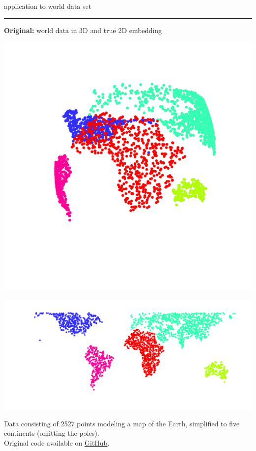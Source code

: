 \documentclass[11pt, compress, t, notes = noshow, xcolor = table, 
aspectratio = 1610]{beamer}
\begin{document}

\LARGE
\begin{frame}[noframenumbering]{application to world data set}
\normalsize
\vspace{-0.5cm}
\noindent \textcolor{gray!90}{\rule{\textwidth}{1pt}}
\smallskip

\textbf{Original:} world data in 3D and true 2D embedding 

\begin{minipage}[c]{0.33\textwidth}
  \includegraphics[trim = 50 0 50 0, clip, %
      width = \textwidth]{figures/world_3d}
\end{minipage}%
\begin{minipage}[c]{0.67\textwidth}
  \includegraphics[trim = 20 0 0 50, clip, %
      width = \textwidth]{figures/world_2d}
\end{minipage}

\vfill

\scriptsize
Data consisting of 2527 points modeling a map of the Earth, simplified to five 
continents (omitting the poles). \\
Original code available on \href{https://github.com/NikolayOskolkov/tSNE_vs_UMAP_GlobalStructure}{\underline{GitHub}}.

\end{frame}
\end{document}
